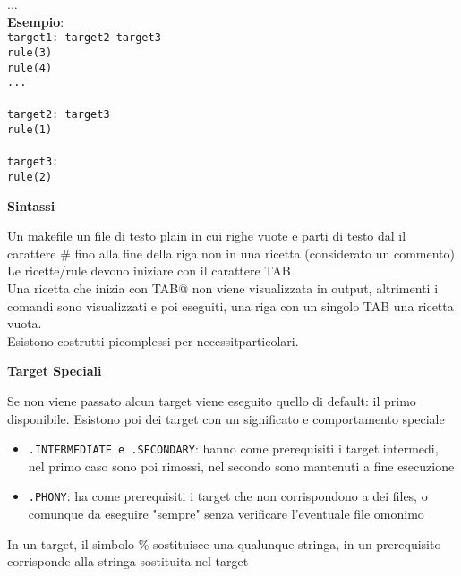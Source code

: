 \begin{flushleft}
\begin{flushleft}
{            \tab ...\\}
    \textbf{Esempio}:\\
    \texttt{target1: target2 target3 \\
            \tab rule(3)\\
            \tab rule(4) \\
            \tab ...\\
            \tab \\
            target2: target3 \\
            \tab rule(1) \\
            \tab \\ 
            target3:\\
            \tab rule(2)}
    \begin{flushleft}
      \textbf{Sintassi}\par
      Un makefile \ace un file di testo plain in cui righe vuote e parti di testo dal 
      il carattere \# fino alla fine della riga non  in una ricetta (considerato un commento)\\
      Le ricette/rule devono iniziare con il carattere TAB \\
      Una ricetta che inizia con TAB@ non viene visualizzata in output, altrimenti i 
      comandi sono visualizzati e poi eseguiti, una riga con un singolo TAB \ace una ricetta vuota.\\
      Esistono costrutti pi\acu complessi  per necessit\aca particolari. 
    \end{flushleft}
    \begin{flushleft}
      \textbf{Target Speciali}\par 
      Se non viene passato alcun target viene eseguito quello di default: il primo disponibile. 
      Esistono poi dei target con un significato e comportamento speciale 
      \begin{itemize}
        \item \texttt{.INTERMEDIATE e .SECONDARY}: hanno come prerequisiti i target intermedi, nel primo 
              caso sono poi rimossi, nel secondo sono mantenuti a fine esecuzione
        \item \texttt{.PHONY}: ha come prerequisiti i target che non corrispondono a dei files, o 
              comunque da eseguire "sempre" senza verificare l'eventuale file omonimo
      \end{itemize}
      In un target, il simbolo \% sostituisce una qualunque stringa, in un prerequisito
      corrisponde alla stringa sostituita nel target\\

\end{flushleft}
\end{flushleft}
\end{flushleft}
